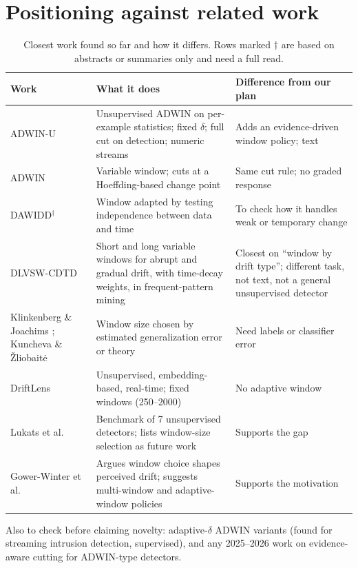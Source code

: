 \documentclass[11pt,a4paper]{article}
\begin{document}
\section{Positioning against related work}
\label{sec:related}

\begin{table}[h]
\centering
\small
\caption{Closest work found so far and how it differs. Rows marked $\dagger$ are based on abstracts or summaries only and need a full read.}
\label{tab:related}
\begin{tabular}{p{3.6cm}p{5.6cm}p{4.2cm}}
\toprule
Work & What it does & Difference from our plan \\
\midrule
ADWIN-U \cite{assis2025} & Unsupervised ADWIN on per-example statistics; fixed $\delta$; full cut on detection; numeric streams & Adds an evidence-driven window policy; text \\
ADWIN \cite{bifet2007} & Variable window; cuts at a Hoeffding-based change point & Same cut rule; no graded response \\
DAWIDD$^\dagger$ \cite{hinder2020} & Window adapted by testing independence between data and time & To check how it handles weak or temporary change \\
DLVSW-CDTD \cite{chen2024} & Short and long variable windows for abrupt and gradual drift, with time-decay weights, in frequent-pattern mining & Closest on ``window by drift type''; different task, not text, not a general unsupervised detector \\
Klinkenberg \& Joachims \cite{klinkenberg2000}; Kuncheva \& \v{Z}liobait\.{e} \cite{kuncheva2009} & Window size chosen by estimated generalization error or theory & Need labels or classifier error \\
DriftLens \cite{greco2024} & Unsupervised, embedding-based, real-time; fixed windows (250--2000) & No adaptive window \\
Lukats et al.\ \cite{lukats2025} & Benchmark of 7 unsupervised detectors; lists window-size selection as future work & Supports the gap \\
Gower-Winter et al.\ \cite{gowerwinter2026} & Argues window choice shapes perceived drift; suggests multi-window and adaptive-window policies & Supports the motivation \\
\bottomrule
\end{tabular}
\end{table}

Also to check before claiming novelty: adaptive-$\delta$ ADWIN variants (found for streaming intrusion detection, supervised), and any 2025--2026 work on evidence-aware cutting for ADWIN-type detectors.
\end{document}
